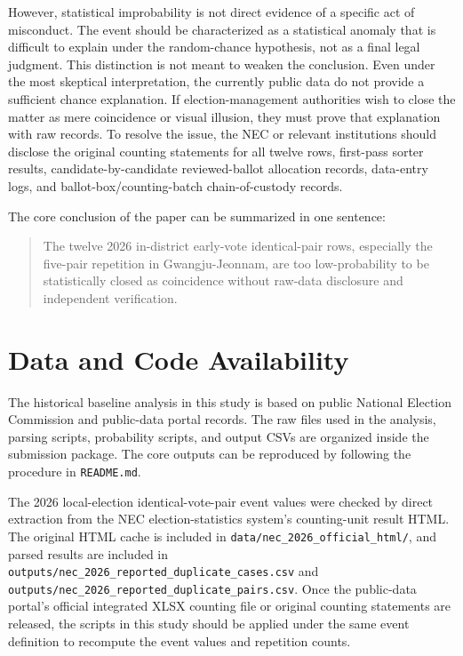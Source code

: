 \documentclass[preprint]{IEIE}
\begin{document}
However, statistical improbability is not direct evidence of a specific act of misconduct. The event should be characterized as a statistical anomaly that is difficult to explain under the random-chance hypothesis, not as a final legal judgment. This distinction is not meant to weaken the conclusion. Even under the most skeptical interpretation, the currently public data do not provide a sufficient chance explanation. If election-management authorities wish to close the matter as mere coincidence or visual illusion, they must prove that explanation with raw records. To resolve the issue, the NEC or relevant institutions should disclose the original counting statements for all twelve rows, first-pass sorter results, candidate-by-candidate reviewed-ballot allocation records, data-entry logs, and ballot-box/counting-batch chain-of-custody records.

The core conclusion of the paper can be summarized in one sentence:

\begin{quote}
The twelve 2026 in-district early-vote identical-pair rows, especially the five-pair repetition in Gwangju-Jeonnam, are too low-probability to be statistically closed as coincidence without raw-data disclosure and independent verification.
\end{quote}

\section{Data and Code Availability}

The historical baseline analysis in this study is based on public National Election Commission and public-data portal records. The raw files used in the analysis, parsing scripts, probability scripts, and output CSVs are organized inside the submission package. The core outputs can be reproduced by following the procedure in \texttt{README.md}.

The 2026 local-election identical-vote-pair event values were checked by direct extraction from the NEC election-statistics system's counting-unit result HTML. The original HTML cache is included in \texttt{data/nec\_2026\_official\_html/}, and parsed results are included in \texttt{outputs/nec\_2026\_reported\_duplicate\_cases.csv} and \texttt{outputs/nec\_2026\_reported\_duplicate\_pairs.csv}. Once the public-data portal's official integrated XLSX counting file or original counting statements are released, the scripts in this study should be applied under the same event definition to recompute the event values and repetition counts.
\end{document}
